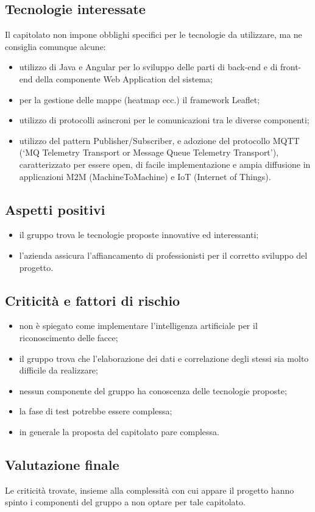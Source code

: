 \subsection{Tecnologie interessate}
Il capitolato non impone obblighi specifici per le tecnologie da utilizzare, ma ne consiglia comunque alcune:
\begin{itemize}
\item utilizzo di Java e Angular per lo sviluppo delle parti di back-end e di front-end della componente Web
Application del sistema;
\item per la gestione delle mappe (heatmap ecc.) il framework Leaflet;
\item utilizzo di protocolli asincroni per le comunicazioni tra le diverse componenti;
\item utilizzo del pattern Publisher/Subscriber, e adozione del protocollo MQTT (‘MQ Telemetry Transport
or Message Queue Telemetry Transport’), caratterizzato per essere open, di facile implementazione
e ampia diffusione in applicazioni M2M (MachineToMachine) e IoT (Internet of Things).
\end{itemize}

\subsection{Aspetti positivi}
\begin{itemize}
\item il gruppo trova le tecnologie proposte innovative ed interessanti;
\item l'azienda assicura l'affiancamento di professionisti per il corretto sviluppo del progetto.
\end{itemize}

\subsection{Criticità e fattori di rischio}
\begin{itemize}
\item non è spiegato come implementare l'intelligenza artificiale per il riconoscimento delle facce;
\item il gruppo trova che l'elaborazione dei dati e correlazione degli stessi sia molto difficile da realizzare;
\item nessun componente del gruppo ha conoscenza delle tecnologie proposte;
\item la fase di test potrebbe essere complessa;
\item in generale la proposta del capitolato pare complessa.
\end{itemize}

\subsection{Valutazione finale}
Le criticità trovate, insieme alla complessità con cui appare il progetto hanno spinto i componenti del gruppo a non optare per tale capitolato.
